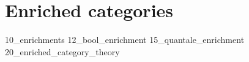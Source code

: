 \setchapterpreamble[u]{\margintoc}

\chapter{Enriched categories}
\label{chap:enrichment}
%


{10_enrichments}
{12_bool_enrichment}
{15_quantale_enrichment}
{20_enriched_category_theory}




